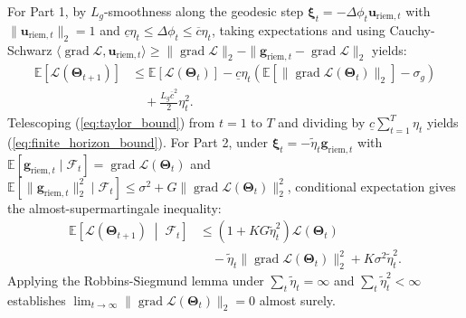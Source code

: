 \documentclass[journal]{IEEEtran}
\begin{document}
\begin{IEEEproof}
For Part 1, by $L_g$-smoothness along the geodesic step $\boldsymbol{\xi}_t = -\Delta\phi_t \mathbf{u}_{\text{riem},t}$ with $\|\mathbf{u}_{\text{riem},t}\|_2 = 1$ and $\underline{c}\eta_t \le \Delta\phi_t \le \overline{c}\eta_t$, taking expectations and using Cauchy-Schwarz $\langle \operatorname{grad}\mathcal{L}, \mathbf{u}_{\text{riem},t} \rangle \ge \|\operatorname{grad}\mathcal{L}\|_2 - \|\mathbf{g}_{\text{riem},t} - \operatorname{grad}\mathcal{L}\|_2$ yields:
\begin{equation}
\begin{aligned}
\mathbb{E}[\mathcal{L}(\boldsymbol{\Theta}_{t+1})] &\le \mathbb{E}[\mathcal{L}(\boldsymbol{\Theta}_t)] - \underline{c}\eta_t\left(\mathbb{E}[\|\operatorname{grad}\mathcal{L}(\boldsymbol{\Theta}_t)\|_2] - \sigma_g\right) \\
&\quad + \frac{L_g \overline{c}^2}{2}\eta_t^2.
\end{aligned}
\label{eq:taylor_bound}
\end{equation}
Telescoping (\ref{eq:taylor_bound}) from $t=1$ to $T$ and dividing by $\underline{c}\sum_{t=1}^T \eta_t$ yields (\ref{eq:finite_horizon_bound}). For Part 2, under $\boldsymbol{\xi}_t = -\tilde{\eta}_t \mathbf{g}_{\text{riem},t}$ with $\mathbb{E}[\mathbf{g}_{\text{riem},t} \mid \mathcal{F}_t] = \operatorname{grad}\mathcal{L}(\boldsymbol{\Theta}_t)$ and $\mathbb{E}[\|\mathbf{g}_{\text{riem},t}\|_2^2 \mid \mathcal{F}_t] \le \sigma^2 + G\|\operatorname{grad}\mathcal{L}(\boldsymbol{\Theta}_t)\|_2^2$, conditional expectation gives the almost-supermartingale inequality:
\begin{equation}
\begin{aligned}
\mathbb{E}\!\left[\mathcal{L}(\boldsymbol{\Theta}_{t+1}) \;\middle|\; \mathcal{F}_t\right] &\le \left(1 + K G \tilde{\eta}_t^2\right)\mathcal{L}(\boldsymbol{\Theta}_t) \\
&\quad - \tilde{\eta}_t \|\operatorname{grad}\mathcal{L}(\boldsymbol{\Theta}_t)\|_2^2 + K\sigma^2 \tilde{\eta}_t^2.
\end{aligned}
\label{eq:supermartingale}
\end{equation}
Applying the Robbins-Siegmund lemma \cite{robbins1971convergence,bonnabel2013stochastic} under $\sum_t \tilde{\eta}_t = \infty$ and $\sum_t \tilde{\eta}_t^2 < \infty$ establishes $\lim_{t\to\infty} \|\operatorname{grad}\mathcal{L}(\boldsymbol{\Theta}_t)\|_2 = 0$ almost surely.
\end{IEEEproof}
\end{document}
